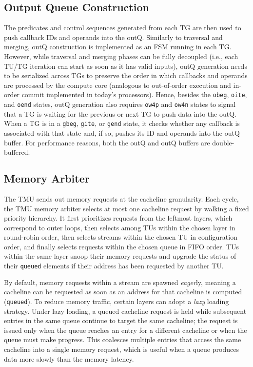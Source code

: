 \subsection{Output Queue Construction} \label{sec:tmu-output-queue-construction} %

The predicates and control sequences generated from each TG are then used to push callback IDs and operands into the outQ.
Similarly to traversal and merging, outQ construction is implemented as an FSM running in each TG.
However, while traversal and merging phases can be fully decoupled (i.e., each TU/TG iteration can start as soon as it has valid inputs), outQ generation needs to be serialized across TGs to preserve the order in which callbacks and operands are processed by the compute core (analogous to out-of-order execution and in-order commit implemented in today's processors).
Hence, besides the \texttt{obeg}, \texttt{oite}, and \texttt{oend} states, outQ generation also requires \texttt{ow4p} and \texttt{ow4n} states to signal that a TG is waiting for the previous or next TG to push data into the outQ.
When a TG is in a \texttt{gbeg}, \texttt{gite}, or \texttt{gend} state, it checks whether any callback is associated with that state and, if so, pushes its ID and operands into the outQ buffer.
For performance reasons, both the outQ and outQ buffers are double-buffered.

\subsection{Memory Arbiter} \label{sec:tmu-memory-arbiter} %

The TMU sends out memory requests at the cacheline granularity.
Each cycle, the TMU memory arbiter selects at most one cacheline request by walking a fixed priority hierarchy.
It first prioritizes requests from the leftmost layers, which correspond to outer loops, then selects among TUs within the chosen layer in round-robin order, then selects streams within the chosen TU in configuration order, and finally selects requests within the chosen queue in FIFO order.
TUs within the same layer snoop their memory requests and upgrade the status of their \texttt{queued} elements if their address has been requested by another TU.

By default, memory requests within a stream are spawned \emph{eager}ly, meaning a cacheline can be requested as soon as an address for that cacheline is computed (\texttt{queued}). To reduce memory traffic, certain layers can adopt a \emph{lazy} loading strategy. Under lazy loading, a queued cacheline request is held while subsequent entries in the same queue continue to target the same cacheline; the request is issued only when the queue reaches an entry for a different cacheline or when the queue must make progress. This coalesces multiple entries that access the same cacheline into a single memory request, which is useful when a queue produces data more slowly than the memory latency.

